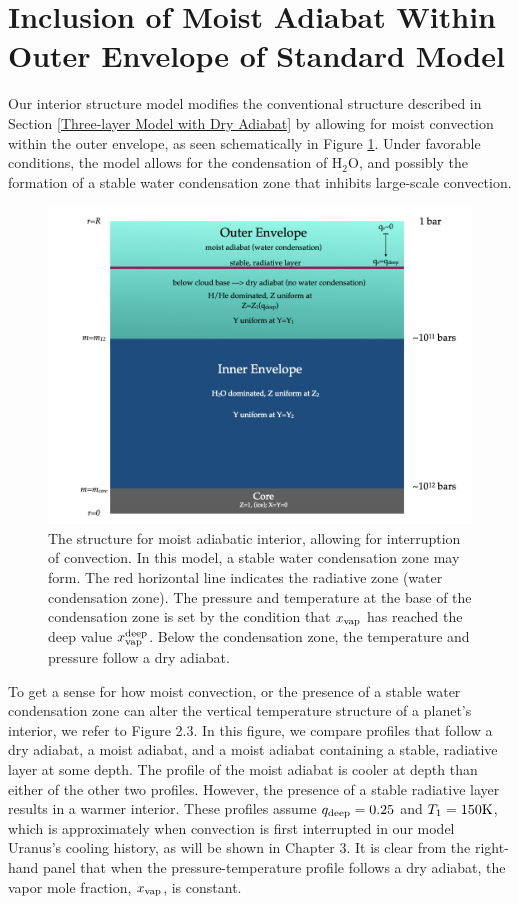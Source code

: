 \documentclass[11pt]{ucscthesisbs}
\begin{document}
\section{Inclusion of Moist Adiabat Within Outer Envelope of Standard Model}
Our interior structure model modifies the conventional structure described in Section \ref{Three-layer Model with Dry Adiabat} by allowing for moist convection within the outer envelope, as seen schematically in Figure \ref{fig:moist_interior}. Under favorable conditions, the model allows for the condensation of H$_{2}$O, and possibly the formation of a stable water condensation zone that inhibits large-scale convection. 
\begin{figure}[ht!]
 \centerline{
  \includegraphics[width=\columnwidth]{figures/structure_schematic/structure_schematic.002.jpeg}
 }
\caption[Interior Structure for Moist Adiabat]
{The structure for moist adiabatic interior, allowing for interruption of convection. In this model, a stable water condensation zone may form. The red horizontal line indicates the radiative zone (water condensation zone). The pressure and temperature at the base of the condensation zone is set by the condition that $x_{\rm vap}$ has reached the deep value $x_{\rm vap}^{\rm deep}$. Below the condensation zone, the temperature and pressure follow a dry adiabat.}
\label{fig:moist_interior}
\end{figure}
To get a sense for how moist convection, or the presence of a stable water condensation zone can alter the vertical temperature structure of a planet's interior, we refer to Figure 2.3. In this figure, we compare profiles that follow a dry adiabat, a moist adiabat, and a moist adiabat containing a stable, radiative layer at some depth. The profile of the moist adiabat is cooler at depth than either of the other two profiles. However, the presence of a stable radiative layer results in a warmer interior. These profiles assume $q_{\rm deep} = 0.25$ and $T_{1} = 150\rm K$, which is approximately when convection is first interrupted in our model Uranus's cooling history, as will be shown in Chapter 3. It is clear from the right-hand panel that when the pressure-temperature profile follows a dry adiabat, the vapor mole fraction, $x_{\rm vap}$, is constant.
\end{document}
